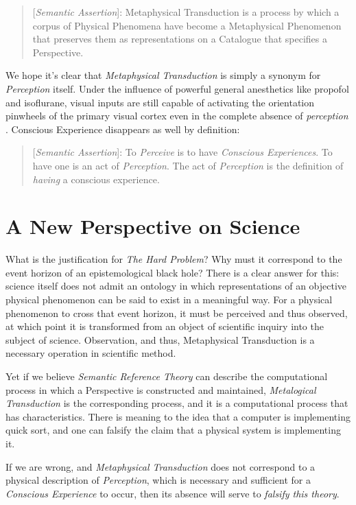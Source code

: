 \documentclass[runningheads]{llncs}
\begin{document}
\begin{quote}
[\emph{Semantic Assertion}]: Metaphysical Transduction is a process by which a corpus of Physical Phenomena have become a Metaphysical Phenomenon that preserves them as representations on a Catalogue that specifies a Perspective.
\end{quote}

We hope it's clear that \emph{Metaphysical Transduction} is simply a synonym for \emph{Perception} itself. Under the influence of powerful general anesthetics like propofol and isoflurane, visual inputs are still capable of activating the orientation pinwheels of the primary visual cortex even in the complete absence of \emph{perception}\cite{Bugrova2020} \cite{Khan2024}. Conscious Experience disappears as well by definition:

\begin{quote}
[\emph{Semantic Assertion}]: To \emph{Perceive} is to have \emph{Conscious Experiences}. To have one is an act of \emph{Perception}. The act of \emph{Perception} is the definition of \emph{having} a conscious experience.
\end{quote}

\section{A New Perspective on Science}

What is the justification for \emph{The Hard Problem}? Why must it correspond to the event horizon of an epistemological black hole? There is a clear answer for this: science itself does not admit an ontology in which representations of an objective physical phenomenon can be said to exist in a meaningful way. For a physical phenomenon to cross that event horizon, it must be perceived and thus observed, at which point it is transformed from an object of scientific inquiry into the subject of science. Observation, and thus, Metaphysical Transduction is a necessary operation in scientific method\cite{Popper1959}.

Yet if we believe \emph{Semantic Reference Theory} can describe the computational process in which a Perspective is constructed and maintained, \emph{Metalogical Transduction} is the corresponding process, and it is a computational process that has characteristics. There is meaning to the idea that a computer is implementing quick sort, and one can falsify the claim that a physical system is implementing it.

If we are wrong, and \emph{Metaphysical Transduction} does not correspond to a physical description of \emph{Perception}, which is necessary and sufficient for a \emph{Conscious Experience} to occur, then its absence will serve to \emph{falsify this theory}.
\end{document}
